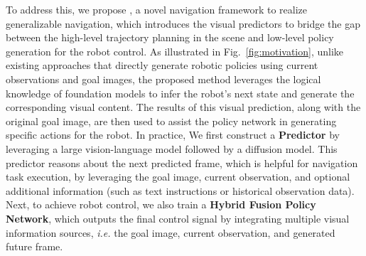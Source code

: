 %



To address this, we propose \mname, a novel navigation framework to realize generalizable navigation, which introduces the visual predictors to bridge the gap between the high-level trajectory planning in the scene and low-level policy generation for the robot control.
%
As illustrated in Fig.~\ref{fig:motivation}, unlike existing approaches that directly generate robotic policies using current observations and goal images, the proposed method leverages the logical knowledge of foundation models to infer the robot's next state and generate the corresponding visual content. The results of this visual prediction, along with the original goal image, are then used to assist the policy network in generating specific actions for the robot.
%
In practice, We first construct a \textbf{Predictor} by leveraging a large vision-language model followed by a diffusion model. This predictor reasons about the next predicted frame, which is helpful for navigation task execution, by leveraging the goal image, current observation, and optional additional information (such as text instructions or historical observation data). 
%
Next, to achieve robot control, we also train a \textbf{Hybrid Fusion Policy Network}, which outputs the final control signal by integrating multiple visual information sources, \textit{i.e.} the goal image, current observation, and generated future frame.



%
%


